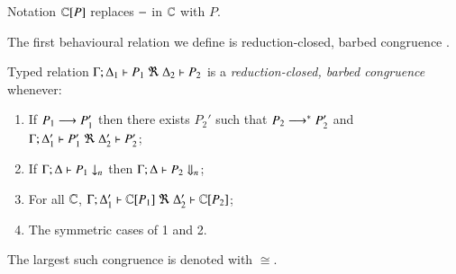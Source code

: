 \noi 
Notation ${\Bbb C}[P]$ replaces 
$-$ in ${\Bbb C}$ with $P$.

\smallskip 

\noi The first behavioural relation we define is reduction-closed, barbed congruence \cite{HondaKYoshida95}. 

\smallskip 

\begin{definition}\rm
\label{def:rc}
	Typed relation
	$\horel{\Gamma}{\Delta_1}{P_1}{\ \Re\ }{\Delta_2}{P_2}$
	is a {\em reduction-closed, barbed congruence} whenever:
	\begin{enumerate}[1)]
		\item	If $P_1 \longrightarrow P_1'$ then there exists $P_2'$ such that $P_2 \longrightarrow^* P_2'$ and
			$\horel{\Gamma}{\Delta_1'}{P_1'}{\ \Re\ }{\Delta_2'}{P_2'}$; 

			\item	If $\Gamma;\Delta \vdash P_1 \downarrow_{n}$ then $\Gamma;\Delta \vdash P_2 \Downarrow_{n}$; %


		\item	For all ${\Bbb C}$, $\horel{\Gamma}{\Delta_1'}{\context{\C}{P_1}}{\ \Re\ }{\Delta_2'}{\context{\C}{P_2}}$;
		                      \item	The symmetric cases of 1 and 2.                
	\end{enumerate}
	The largest such congruence is denoted with $\cong$.
\end{definition}


